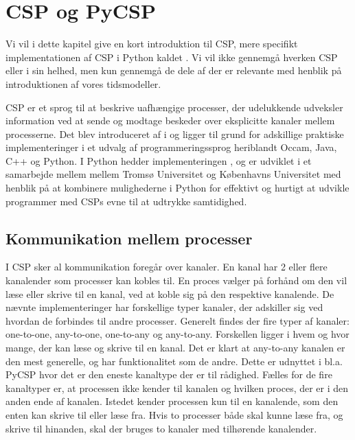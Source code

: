 \chapter{CSP og PyCSP}\label{sec:csp}


Vi vil i dette kapitel give en kort introduktion til CSP, mere specifikt implementationen af CSP i Python kaldet \pycsp. Vi vil ikke gennemgå hverken CSP eller \pycsp i sin helhed, men kun gennemgå de dele af \pycsp der er relevante med henblik på introduktionen af vores tidsmodeller. 

CSP er et sprog til at beskrive uafhængige processer, der udelukkende udveksler information ved at sende og modtage beskeder over eksplicitte kanaler mellem processerne. Det blev introduceret af \citeauthor{hoare-csp} i \cite{hoare-csp} og ligger til grund for adskillige praktiske implementeringer i et udvalg af programmeringssprog heriblandt Occam, Java, C++ og Python\cite{May1983, jcsp, Brown2007, pycsp}. I Python hedder implementeringen \pycsp, og er udviklet i et samarbejde mellem mellem Tromsø Universitet og Københavns Universitet med henblik på at kombinere mulighederne i Python for effektivt og hurtigt at udvikle programmer med CSPs evne til at udtrykke samtidighed\cite{pycsp}. 

\section{Kommunikation mellem processer}
I CSP sker al kommunikation foregår over kanaler. En kanal har 2 eller flere kanalender som processer kan kobles til. En proces vælger på forhånd om den vil læse eller skrive til en kanal, ved at koble sig på den respektive kanalende. De nævnte implementeringer har forskellige typer kanaler, der adskiller sig ved  hvordan de forbindes til andre processer. Generelt findes der fire typer af kanaler: one-to-one, any-to-one, one-to-any og any-to-any. Forskellen ligger i hvem og hvor mange, der kan læse og skrive til en kanal. Det er klart at any-to-any kanalen er den mest generelle, og har funktionalitet som de andre. Dette er udnyttet i bl.a. PyCSP hvor det er den eneste kanaltype der er til rådighed. Fælles for de fire kanaltyper er, at processen ikke kender til kanalen og hvilken proces, der er i den anden ende af kanalen. Istedet kender processen kun til en  kanalende, som  den enten kan skrive til eller læse fra. Hvis to processer både skal kunne læse fra, og skrive til hinanden, skal der bruges to kanaler med tilhørende kanalender. 

